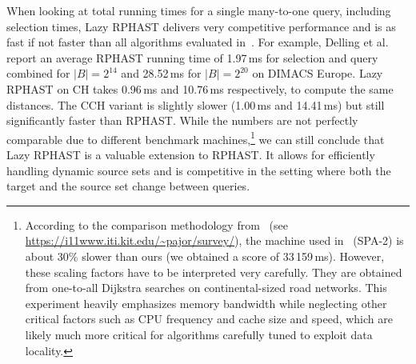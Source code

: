 \documentclass[manuscript,review]{acmart}
\begin{document}
When looking at total running times for a single many-to-one query, including selection times, Lazy RPHAST delivers very competitive performance and is as fast if not faster than all algorithms evaluated in~\cite{delling_et_al:OASIcs:2011:3266}.
For example, Delling et al. report an average RPHAST running time of 1.97\,ms for selection and query combined for $|B| = 2^{14}$ and 28.52\,ms for $|B| = 2^{20}$ on DIMACS Europe.
Lazy RPHAST on CH takes 0.96\,ms and 10.76\,ms respectively, to compute the same distances.
The CCH variant is slightly slower (1.00\,ms and 14.41\,ms) but still significantly faster than RPHAST.
While the numbers are not perfectly comparable due to different benchmark machines,\footnote{
According to the comparison methodology from~\cite{bdgmpsww-rptn-16} (see \url{https://i11www.iti.kit.edu/~pajor/survey/}), the machine used in~\cite{delling_et_al:OASIcs:2011:3266} (SPA-2) is about 30\% slower than ours (we obtained a score of 33\,159\,ms).
However, these scaling factors have to be interpreted very carefully.
They are obtained from one-to-all Dijkstra searches on continental-sized road networks.
This experiment heavily emphasizes memory bandwidth while neglecting other critical factors such as CPU frequency and cache size and speed, which are likely much more critical for algorithms carefully tuned to exploit data locality.
} we can still conclude that Lazy RPHAST is a valuable extension to RPHAST.
It allows for efficiently handling dynamic source sets and is competitive in the setting where both the target and the source set change between queries.

\end{document}
